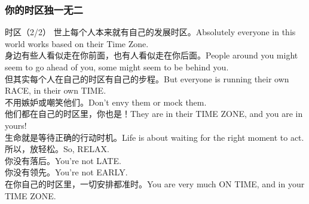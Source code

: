 \begin{frame}
  \frametitle{你的时区独一无二}
  \begin{block}{时区（2/2）}
    {\small
世上每个人本来就有自己的发展时区。Absolutely everyone in this world works based on their Time Zone.\\
身边有些人看似走在你前面，也有人看似走在你后面。People around you might seem to go ahead of you, some might seem to be behind you.\\
但其实每个人在自己的时区有自己的步程。But everyone is running their own RACE, in their own TIME.\\
不用嫉妒或嘲笑他们。Don't envy them or mock them.\\
他们都在自己的时区里，你也是！They are in their TIME ZONE, and you are in yours!\\
生命就是等待正确的行动时机。Life is about waiting for the right moment to act.\\
所以，放轻松。So, RELAX.\\
你没有落后。You're not LATE.\\
你没有领先。You're not EARLY.\\
在你自己的时区里，一切安排都准时。You are very much ON TIME, and in your TIME ZONE.
}
  \end{block}
\end{frame}





